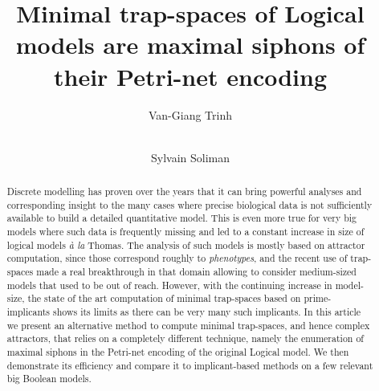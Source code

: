 \documentclass[runningheads]{llncs}
\begin{document}
%
\title{Minimal trap-spaces of Logical models are maximal siphons of their Petri-net encoding}
\author{Van-Giang Trinh \and \\
  Sylvain Soliman}


\maketitle

\begin{abstract}

  Discrete modelling has proven over the years that it can bring powerful analyses and corresponding insight to the many cases where precise biological data is not sufficiently available to build a detailed quantitative model.
  This is even more true for very big models where such data is frequently missing and led to a constant increase in size of logical models \emph{à la} Thomas.
  The analysis of such models is mostly based on attractor computation, since those correspond roughly to \emph{phenotypes}, and the recent use of trap-spaces made a real breakthrough in that domain allowing to consider medium-sized models that used to be out of reach.
  However, with the continuing increase in model-size, the state of the art computation of minimal trap-spaces based on prime-implicants shows its limits as there can be very many such implicants.
  In this article we present an alternative method to compute minimal trap-spaces, and hence complex attractors, that relies on a completely different technique, namely the enumeration of maximal siphons in the Petri-net encoding of the original Logical model.
  We then demonstrate its efficiency and compare it to implicant-based methods on a few relevant big Boolean models.

\end{abstract}
\end{document}
